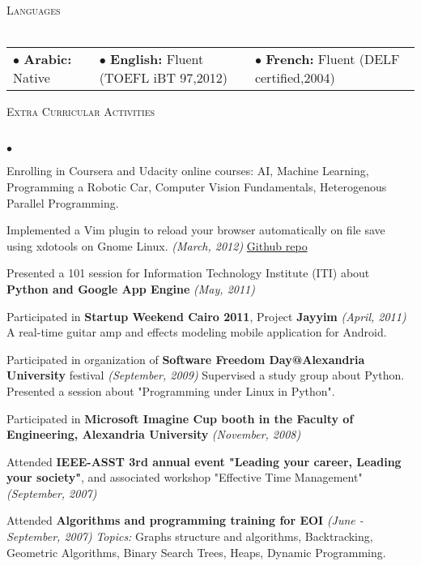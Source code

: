 \documentclass[letterpaper,12pt]{article}
\newcommand{\lineunder}{\vspace*{-8pt} \\ \hspace*{-8pt} \hrulefill \\}
\newcommand{\interval}[1]{\textit{(#1)} }
\newcommand{\header}[1]{{\hspace*{0pt}\vspace*{6pt} \textsc{#1}} \vspace*{-6pt} \lineunder}
\newenvironment{achievements}{\begin{list}{$\bullet$}{\topsep 0pt \itemsep -2pt}}{\vspace*{4pt}\end{list}}
\begin{document}
\header{Languages}
\begin{tabular}{l l l}
$\bullet$ \textbf{Arabic:} Native& 
$\bullet$ \textbf{English:} Fluent (TOEFL iBT 97,2012)&
$\bullet$ \textbf{French:} Fluent (DELF certified,2004)\\
\end{tabular}
\vspace*{4pt}

\header{Extra Curricular Activities}
\begin{achievements}
\item Enrolling in Coursera and Udacity online courses: AI, Machine Learning, Programming a Robotic Car, Computer Vision Fundamentals, Heterogenous Parallel Programming.
\item Implemented a Vim plugin to reload your browser automatically on file save using xdotools on Gnome Linux. \interval{March, 2012} \href{https://github.com/lordm/vim-browser-reload-linux}{Github repo}
\item Presented a 101 session for Information Technology Institute (ITI) about \textbf{Python and Google App Engine} \interval{May, 2011}
\item Participated in \textbf{Startup Weekend Cairo 2011}, Project \textbf{Jayyim} \interval{April, 2011}
  \subitem A real-time guitar amp and effects modeling mobile application for Android.
\item Participated in organization of \textbf{Software Freedom Day@Alexandria University} festival \interval{September, 2009}
  \subitem Supervised a study group about Python.
  \subitem Presented a session about "Programming under Linux in Python".
\item Participated in \textbf{Microsoft Imagine Cup booth in the Faculty of Engineering, Alexandria University} \interval{November, 2008}
\item Attended \textbf{IEEE-ASST 3rd annual event "Leading your career, Leading your society"}, and associated workshop "Effective Time Management" \interval{September, 2007}
\item Attended \textbf{Algorithms and programming training for EOI} \interval{June - September, 2007}
  \subitem \textit{Topics:} Graphs structure and algorithms, Backtracking, Geometric Algorithms, Binary Search Trees, Heaps, Dynamic Programming.
\end{achievements}
\end{document}
